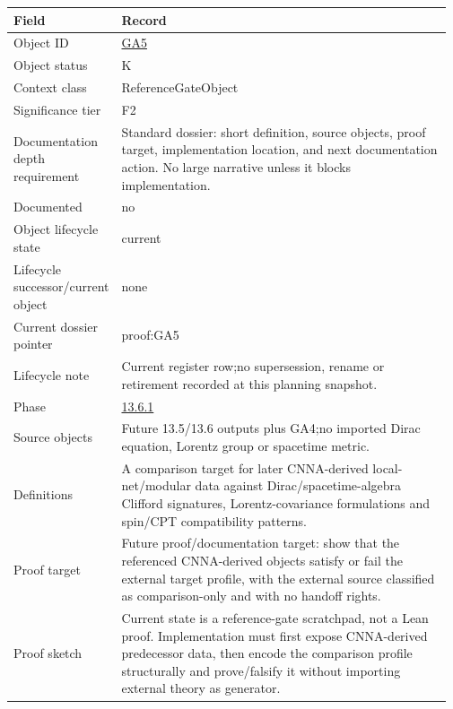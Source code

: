 \begin{longtable}{L{0.16\linewidth} L{0.81\linewidth}}
\hline
\textbf{Field} & \textbf{Record}\\
\hline
Object ID & \hyperlink{object-row-GA5}{GA5}\\
\hline\addlinespace[0.20em]
Object status & K\\
\hline\addlinespace[0.20em]
Context class & ReferenceGateObject\\
\hline\addlinespace[0.20em]
Significance tier & F2\\
\hline\addlinespace[0.20em]
Documentation depth requirement & Standard dossier: short definition, source objects, proof target, implementation location, and next documentation action. No large narrative unless it blocks implementation.\\
\hline\addlinespace[0.20em]
Documented & no\\
\hline\addlinespace[0.20em]
Object lifecycle state & current\\
\hline\addlinespace[0.20em]
Lifecycle successor/\allowbreak{}current object & none\\
\hline\addlinespace[0.20em]
Current dossier pointer & proof:GA5\\
\hline\addlinespace[0.20em]
Lifecycle note & Current register row;\newline no supersession, rename or retirement recorded at this planning snapshot.\\
\hline\addlinespace[0.20em]
Phase & \hyperlink{phase-row-13-6-1}{13.6.1}\\
\hline\addlinespace[0.20em]
Source objects & Future 13.5/\allowbreak{}13.6 outputs plus GA4;\newline no imported Dirac equation, Lorentz group or spacetime metric.\\
\hline\addlinespace[0.20em]
Definitions & A comparison target for later CNNA-derived local-net/\allowbreak{}modular data against Dirac/\allowbreak{}spacetime-algebra Clifford signatures, Lorentz-covariance formulations and spin/\allowbreak{}CPT compatibility patterns.\\
\hline\addlinespace[0.20em]
Proof target & Future proof/\allowbreak{}documentation target: show that the referenced CNNA-derived objects satisfy or fail the external target profile, with the external source classified as comparison-only and with no handoff rights.\\
\hline\addlinespace[0.20em]
Proof sketch & Current state is a reference-gate scratchpad, not a Lean proof. Implementation must first expose CNNA-derived predecessor data, then encode the comparison profile structurally and prove/\allowbreak{}falsify it without importing external theory as generator.\\

\end{longtable}
